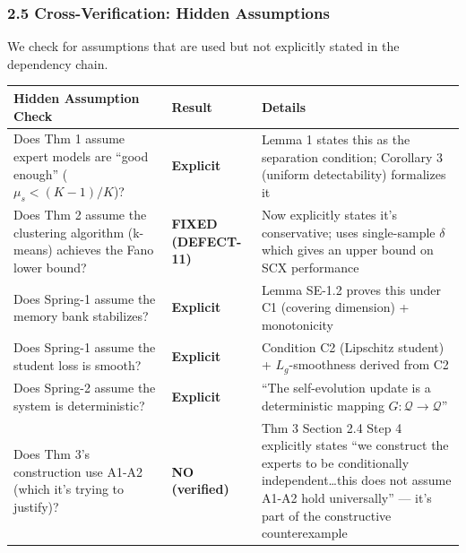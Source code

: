 \documentclass[
  12pt,
]{article}
\begin{document}
\subsubsection{2.5 Cross-Verification: Hidden
Assumptions}\label{cross-verification-hidden-assumptions}

We check for assumptions that are used but not explicitly stated in the
dependency chain.

\begin{longtable}[]{@{}
  >{\raggedright\arraybackslash}p{}
  >{\raggedright\arraybackslash}p{}
  >{\raggedright\arraybackslash}p{}@{}}
\toprule\noalign{}
\begin{minipage}[b]{\linewidth}\raggedright
Hidden Assumption Check
\end{minipage} & \begin{minipage}[b]{\linewidth}\raggedright
Result
\end{minipage} & \begin{minipage}[b]{\linewidth}\raggedright
Details
\end{minipage} \\
\midrule\noalign{}
\endhead
\bottomrule\noalign{}
\endlastfoot
Does Thm 1 assume expert models are ``good enough''
(\(\mu_s < (K-1)/K\))? & \textbf{Explicit} & Lemma 1 states this as the
separation condition; Corollary 3 (uniform detectability) formalizes
it \\
Does Thm 2 assume the clustering algorithm (k-means) achieves the Fano
lower bound? & \textbf{FIXED (DEFECT-11)} & Now explicitly states it's
conservative; uses single-sample \(\delta\) which gives an upper bound
on SCX performance \\
Does Spring-1 assume the memory bank stabilizes? & \textbf{Explicit} &
Lemma SE-1.2 proves this under C1 (covering dimension) + monotonicity \\
Does Spring-1 assume the student loss is smooth? & \textbf{Explicit} &
Condition C2 (Lipschitz student) + \(L_g\)-smoothness derived from C2 \\
Does Spring-2 assume the system is deterministic? & \textbf{Explicit} &
``The self-evolution update is a deterministic mapping
\(G: \mathcal{Q} \to \mathcal{Q}\)'' \\
Does Thm 3's construction use A1-A2 (which it's trying to justify)? &
\textbf{NO (verified)} & Thm 3 Section 2.4 Step 4 explicitly states ``we
construct the experts to be conditionally independent\ldots this does
not assume A1-A2 hold universally'' --- it's part of the constructive
counterexample \\
\end{longtable}
\end{document}
